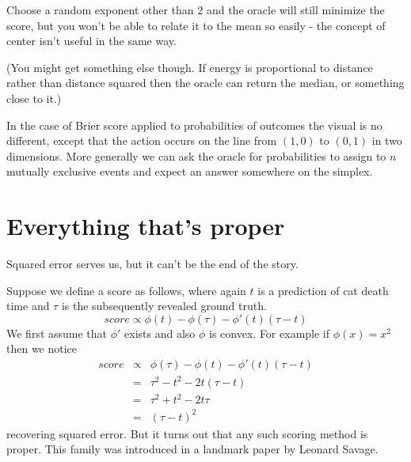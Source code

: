 Choose a random exponent other than $2$ and the oracle will still minimize the score, but you won't be able to relate it to the mean so easily - the concept of center isn't useful in the same way.

(You might get something else though. If energy is proportional to distance rather than distance squared then the oracle can return the median, or something close to it.)

In the case of Brier score applied to probabilities of outcomes the visual is no different, except that the action occurs on the line from $(1,0)$ to $(0,1)$ in two dimensions. More generally we can ask the oracle for probabilities to assign to $n$ mutually exclusive events and expect an answer somewhere on the simplex.

%



\section{Everything that's proper}

Squared error serves us, but it can't be the end of the story. 

Suppose we define a score as follows, where again $t$ is a prediction of cat death time and $\tau$ is the subsequently revealed ground truth. 
$$
     score \propto  \phi(t) - \phi(\tau) - \phi'(t)(\tau-t)
$$
We first assume that $\phi'$ exists and also $\phi$ is convex. For example if $\phi(x)=x^2$ then we notice
\begin{eqnarray*}
    score  & \propto &  \phi(\tau) - \phi(t) - \phi'(t)(\tau-t) \\
           & = &  \tau^2 - t^2 - 2t (\tau-t) \\
           & = &  \tau^2 + t^2 - 2t\tau \\
           & = & (\tau-t)^2
\end{eqnarray*}
recovering squared error. But it turns out that any such scoring method is proper. This family was introduced in a landmark paper by Leonard Savage.

